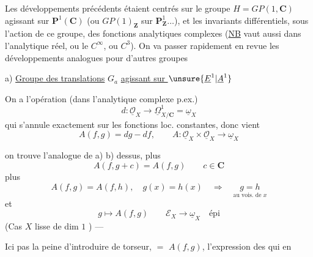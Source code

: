 Les développements précédents étaient centrés
sur le groupe $H=GP(1,\mathbf{C})$ agissant sur $\mathbf{P}^{1}(\mathbf{C})$
(ou $GP(1)_{\mathbf{Z}}$ sur $\mathbf{P}^{1}_{\mathbf{Z}}\ldots$), et les invariants
différentiels, sous l'action de ce groupe, des
fonctions analytiques complexes (\uline{NB} 
vaut aussi dans l'analytique réel, ou le
$C^{\infty}$, ou $C^3$).
On va passer rapidement en revue les développements
analogues pour d'autres groupes

a) \uline{Groupe des translations} $G_a$ \uline{agissant sur $\unsure{\underline{E}^{1}|\underline{A}^{1}}$}

On a l'opération (dans l'analytique complexe
p.ex.)
\[
d:\underline{\mathcal{O}}_X\longrightarrow\underline{\Omega}^{1}_{X/\mathbf{C}}
=\underline{\omega}_X
\]
qui 
s'annule exactement sur les fonctions
loc. constantes, donc vient
\[
A(f,g)=dg-df,\qquad
A:\underline{\mathcal{O}}_X\times\underline{\mathcal{O}}_X
\longrightarrow\underline{\omega}_X
\]

on trouve l'analogue de a) b) dessus,
plus
\[
A(f,g+c)=A(f,g)\qquad c\in\mathbf{C}
\]
plus
\[
A(f,g)=A(f,h),\quad g(x)=h(x)\quad\Longrightarrow\quad
\underset{\text{au vois. de }x}{g=h}
\]
et
\[
g\longmapsto A(f,g)\qquad
\mathcal{E}_X\longrightarrow\underline{\omega}_X\quad\text{épi}
\]
(Cas $X$ lisse de dim $1$ ) ---

Ici pas la peine d'introduire de torseur,
 $=$ $A(f,g)$,  l'expression
des   qui en 

